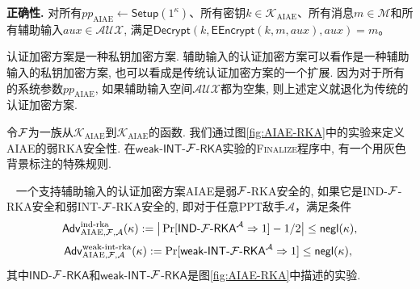 \begin{trivlist}
\item \textbf{正确性.} 对所有$pp_{\text{AIAE}}\leftarrow \mathsf{Setup}(1^{\kappa})$、所有密钥$k \in \mathcal{K}_{\text{AIAE}}$、所有消息$m \in \mathcal{M}$和所有辅助输入$aux \in \mathcal{AUX}$, 满足$\mathsf{Decrypt}(k, \mathsf{EEncrypt}(k, m, aux), aux) = m$。
\end{trivlist}

\begin{note}
认证加密方案是一种私钥加密方案. 辅助输入的认证加密方案可以看作是一种辅助输入的私钥加密方案, 也可以看成是传统认证加密方案的一个扩展. 因为对于所有的系统参数$pp_{\text{AIAE}}$, 如果辅助输入空间$\mathcal{AUX}$都为空集, 则上述定义就退化为传统的认证加密方案.  
\end{note}


令$\mathcal{F}$为一族从$\mathcal{K}_{\text{AIAE}}$到$\mathcal{K}_{\text{AIAE}}$的函数. 我们通过图\ref{fig:AIAE-RKA}中的实验来定义AIAE的弱RKA安全性. 在$\mathsf{weak}$-$\mathsf{INT}$-$\mathcal{F}$-$\mathsf{RKA}$实验的\textsc{Finalize}程序中, 有一个用灰色背景标注的特殊规则.


\begin{definition}~\label{def:weak-RKA-AIAE}
一个支持辅助输入的认证加密方案AIAE是弱$\mathcal{F}$-RKA安全的, 如果它是IND-$\mathcal{F}$-RKA安全和弱INT-$\mathcal{F}$-RKA安全的, 即对于任意PPT敌手$\mathcal{A}$，满足条件
$$\mathsf{Adv}_{\text{AIAE}, \mathcal{F}, \mathcal{A}}^{\text{ind-rka}}(\kappa) := \big| \Pr[ \text{$\mathsf{IND}$-$\mathcal{F}$-$\mathsf{RKA}$}^{\mathcal{A}} \Rightarrow 1] - 1/2 \big| \leq \mathsf{negl}(\kappa),$$
$$\mathsf{Adv}_{\text{AIAE}, \mathcal{F}, \mathcal{A}}^{\text{weak-int-rka}}(\kappa) := \Pr[\text{$\mathsf{weak}$-$\mathsf{INT}$-$\mathcal{F}$-$\mathsf{RKA}$}^{\mathcal{A}} \Rightarrow 1] \leq \mathsf{negl}(\kappa),~$$
其中$\mathsf{IND}$-$\mathcal{F}$-$\mathsf{RKA}$和$\mathsf{weak}$-$\mathsf{INT}$-$\mathcal{F}$-$\mathsf{RKA}$是图\ref{fig:AIAE-RKA}中描述的实验.
\end{definition}

